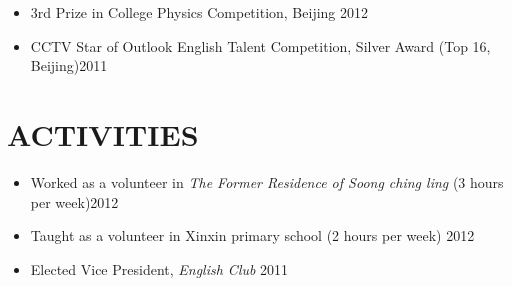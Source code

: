\documentclass[margin,10pt]{res} %
\begin{document}
\begin{resume}
\begin{itemize}
    \item 3rd Prize in College Physics Competition, Beijing {\hfill 2012}\\
    \item CCTV Star of Outlook English Talent Competition, Silver Award (Top 16, Beijing){\hfill 2011}
\end{itemize}

\section{ACTIVITIES}
\begin{itemize}\itemsep -12pt
\item Worked as a volunteer in {\it The Former Residence of Soong ching ling} (3 hours per week){\hfill 2012}\\
\item Taught as a volunteer in Xinxin primary school (2 hours per week) {\hfill  2012}\\
\item Elected Vice President, {\it English Club} {\hfill 2011}\\
\end{itemize}

\end{resume}
\end{document}
